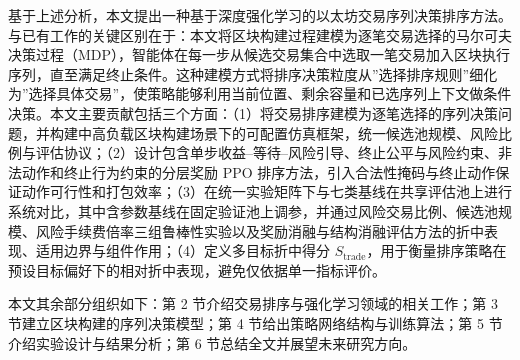 基于上述分析，本文提出一种基于深度强化学习的以太坊交易序列决策排序方法。与已有工作的关键区别在于：本文将区块构建过程建模为逐笔交易选择的马尔可夫决策过程（MDP），智能体在每一步从候选交易集合中选取一笔交易加入区块执行序列，直至满足终止条件。这种建模方式将排序决策粒度从”选择排序规则”细化为”选择具体交易”，使策略能够利用当前位置、剩余容量和已选序列上下文做条件决策。本文主要贡献包括三个方面：（1）将交易排序建模为逐笔选择的序列决策问题，并构建中高负载区块构建场景下的可配置仿真框架，统一候选池规模、风险比例与评估协议；（2）设计包含单步收益--等待--风险引导、终止公平与风险约束、非法动作和终止行为约束的分层奖励 PPO 排序方法，引入合法性掩码与终止动作保证动作可行性和打包效率；（3）在统一实验矩阵下与七类基线在共享评估池上进行系统对比，其中含参数基线在固定验证池上调参，并通过风险交易比例、候选池规模、风险手续费倍率三组鲁棒性实验以及奖励消融与结构消融评估方法的折中表现、适用边界与组件作用；（4）定义多目标折中得分 $S_{\text{trade}}$，用于衡量排序策略在预设目标偏好下的相对折中表现，避免仅依据单一指标评价。

本文其余部分组织如下：第 2 节介绍交易排序与强化学习领域的相关工作；第 3 节建立区块构建的序列决策模型；第 4 节给出策略网络结构与训练算法；第 5 节介绍实验设计与结果分析；第 6 节总结全文并展望未来研究方向。
